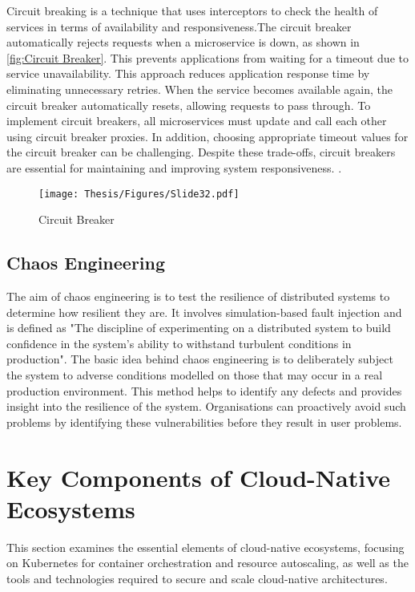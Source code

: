 Circuit breaking is a technique that uses interceptors to check the health of services in terms of availability and responsiveness.The circuit breaker automatically rejects requests when a microservice is down, as shown in \autoref{fig:Circuit Breaker}. This prevents applications from waiting for a timeout due to service unavailability. This approach reduces application response time by eliminating unnecessary retries. When the service becomes available again, the circuit breaker automatically resets, allowing requests to pass through. To implement circuit breakers, all microservices must update and call each other using circuit breaker proxies. In addition, choosing appropriate timeout values for the circuit breaker can be challenging. Despite these trade-offs, circuit breakers are essential for maintaining and improving system responsiveness. \cite{r28}.


\captionsetup{justification=centering}
\begin{figure}[h]
\centering
\texttt{[image: Thesis/Figures/Slide32.pdf]}
\caption{\label{fig:Circuit Breaker}Circuit Breaker \cite{goyal2019circuit}}
\end{figure}


\subsection{Chaos Engineering}

The aim of chaos engineering is to test the resilience of distributed systems to determine how resilient they are. It involves simulation-based fault injection and is defined as "The discipline of experimenting on a distributed system to build confidence in the system's ability to withstand turbulent conditions in production". The basic idea behind chaos engineering is to deliberately subject the system to adverse conditions modelled on those that may occur in a real production environment. This method helps to identify any defects and provides insight into the resilience of the system. Organisations can proactively avoid such problems by identifying these vulnerabilities before they result in user problems. \cite{r29}

\section{Key Components of Cloud-Native Ecosystems}

This section examines the essential elements of cloud-native ecosystems, focusing on Kubernetes for container orchestration and resource autoscaling, as well as the tools and technologies required to secure and scale cloud-native architectures.

